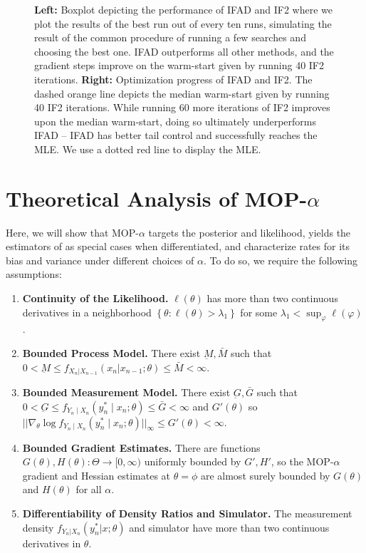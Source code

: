 \documentclass[9pt,twocolumn,twoside]{pnas-new}
\begin{document}
\begin{figure}[ht]
    \caption{\textbf{Left:} Boxplot depicting the performance of IFAD and IF2 where we plot the results of the best run out of every ten runs, simulating the result of the common procedure of running a few searches and choosing the best one. IFAD outperforms all other methods, and the gradient steps improve on the warm-start given by running 40 IF2 iterations. 
    \textbf{Right:} Optimization progress of IFAD and IF2. The dashed orange line depicts the median warm-start given by running 40 IF2 iterations. While running 60 more iterations of IF2 improves upon the median warm-start, doing so ultimately underperforms IFAD -- IFAD has better tail control and successfully reaches the MLE. 
    We use a dotted red line to display the MLE.}
    \label{fig:boxplot-search}
\end{figure}


\section{Theoretical Analysis of MOP-$\alpha$}
\label{sec:thms}

Here, we will show that MOP-$\alpha$ targets the posterior and likelihood, yields the estimators of \cite{poyiadjis11, scibior21, blei2018vsmc} as special cases when differentiated, and characterize rates for its bias and variance under different choices of $\alpha$. To do so, we require the following assumptions:

\begin{enumerate}[label=(A\arabic*),itemsep=-1.2ex] 
    \item \textbf{Continuity of the Likelihood.} $\ell(\theta)$ has more than two continuous derivatives in a neighborhood $\left\{\theta: \ell(\theta)>\lambda_1\right\}$ for some $\lambda_1<\sup _{\varphi} \ell(\varphi)$. \label{assump:conti-lik}
    \item \textbf{Bounded Process Model.} There exist $\underbar{M}, \bar{M}$ such that $0 < \underbar{M} \leq f_{X_n|X_{n-1}}(x_n | x_{n-1};\theta) \leq \bar{M} < \infty$. \label{assump:bounded-process}
    \item \textbf{Bounded Measurement Model.} There exist $\underbar{G}, \bar{G}$ such that $0<\underbar{G} \leq f_{Y_n \mid X_n}\left(y_n^* \mid x_n; \theta\right) \leq \bar{G}<\infty$ and $G'(\theta)$ so $||\nabla_\theta \log f_{Y_n \mid X_n}\left(y_n^* \mid x_n; \theta\right)||_\infty \leq G'(\theta)< \infty$. \label{assump:bounded-measurement}
    \item \textbf{Bounded Gradient Estimates.} There are functions $G(\theta), H(\theta): \Theta \to [0,\infty)$ uniformly bounded by $G', H'$, so the MOP-$\alpha$ gradient and Hessian estimates at $\theta=\phi$ are almost surely bounded by $G(\theta)$ and $H(\theta)$ for all $\alpha$. \label{assump:local-bounded-derivative}
    \item \textbf{Differentiability of Density Ratios and Simulator.} The measurement density $f_{Y_n|X_n}(y_n^*|x; \theta)$ and simulator have more than two continuous derivatives in $\theta$. \label{assump:diff-meas-and-sim}
\end{enumerate}
\end{document}
